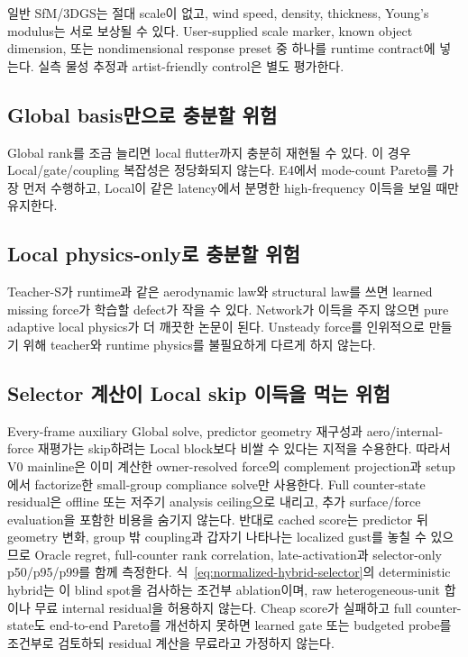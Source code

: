 \documentclass[11pt,a4paper]{article}
\begin{document}
일반 SfM/3DGS는 절대 scale이 없고,
wind speed, density, thickness, Young's modulus는 서로 보상될 수 있다.
User-supplied scale marker, known object dimension,
또는 nondimensional response preset 중 하나를 runtime contract에 넣는다.
실측 물성 추정과 artist-friendly control은 별도 평가한다.

\subsection{Global basis만으로 충분할 위험}

Global rank를 조금 늘리면 local flutter까지 충분히 재현될 수 있다.
이 경우 Local/gate/coupling 복잡성은 정당화되지 않는다.
E4에서 mode-count Pareto를 가장 먼저 수행하고,
Local이 같은 latency에서 분명한 high-frequency 이득을 보일 때만 유지한다.

\subsection{Local physics-only로 충분할 위험}

Teacher-S가 runtime과 같은 aerodynamic law와 structural law를 쓰면
learned missing force가 학습할 defect가 작을 수 있다.
Network가 이득을 주지 않으면 pure adaptive local physics가 더 깨끗한 논문이 된다.
Unsteady force를 인위적으로 만들기 위해 teacher와 runtime physics를 불필요하게 다르게 하지 않는다.

\subsection{Selector 계산이 Local skip 이득을 먹는 위험}

Every-frame auxiliary Global solve, predictor geometry 재구성과 aero/internal-force 재평가는
skip하려는 Local block보다 비쌀 수 있다는 지적을 수용한다.
따라서 V0 mainline은 이미 계산한 owner-resolved force의 complement projection과
setup에서 factorize한 small-group compliance solve만 사용한다.
Full counter-state residual은 offline 또는 저주기 analysis ceiling으로 내리고,
추가 surface/force evaluation을 포함한 비용을 숨기지 않는다.
반대로 cached score는 predictor 뒤 geometry 변화, group 밖 coupling과 갑자기 나타나는
localized gust를 놓칠 수 있으므로 Oracle regret, full-counter rank correlation,
late-activation과 selector-only p50/p95/p99를 함께 측정한다.
식~\eqref{eq:normalized-hybrid-selector}의 deterministic hybrid는 이 blind spot을 검사하는
조건부 ablation이며, raw heterogeneous-unit 합이나 무료 internal residual을 허용하지 않는다.
Cheap score가 실패하고 full counter-state도 end-to-end Pareto를 개선하지 못하면
learned gate 또는 budgeted probe를 조건부로 검토하되 residual 계산을 무료라고 가정하지 않는다.
\end{document}
